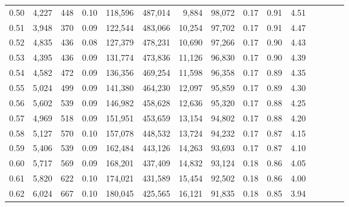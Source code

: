 \begin{tabular}{rrrcrrrrrrrrrrr}
0.50 &   4,227 &    448 &                                       0.10 &  118,596 &  487,014 &    9,884 &   98,072 &  0.17 &  0.91 &                         4.51 \\
0.51 &   3,948 &    370 &                                       0.09 &  122,544 &  483,066 &   10,254 &   97,702 &  0.17 &  0.91 &                         4.47 \\
0.52 &   4,835 &    436 &                                       0.08 &  127,379 &  478,231 &   10,690 &   97,266 &  0.17 &  0.90 &                         4.43 \\
0.53 &   4,395 &    436 &                                       0.09 &  131,774 &  473,836 &   11,126 &   96,830 &  0.17 &  0.90 &                         4.39 \\
0.54 &   4,582 &    472 &                                       0.09 &  136,356 &  469,254 &   11,598 &   96,358 &  0.17 &  0.89 &                         4.35 \\
0.55 &   5,024 &    499 &                                       0.09 &  141,380 &  464,230 &   12,097 &   95,859 &  0.17 &  0.89 &                         4.30 \\
0.56 &   5,602 &    539 &                                       0.09 &  146,982 &  458,628 &   12,636 &   95,320 &  0.17 &  0.88 &                         4.25 \\
0.57 &   4,969 &    518 &                                       0.09 &  151,951 &  453,659 &   13,154 &   94,802 &  0.17 &  0.88 &                         4.20 \\
0.58 &   5,127 &    570 &                                       0.10 &  157,078 &  448,532 &   13,724 &   94,232 &  0.17 &  0.87 &                         4.15 \\
0.59 &   5,406 &    539 &                                       0.09 &  162,484 &  443,126 &   14,263 &   93,693 &  0.17 &  0.87 &                         4.10 \\
0.60 &   5,717 &    569 &                                       0.09 &  168,201 &  437,409 &   14,832 &   93,124 &  0.18 &  0.86 &                         4.05 \\
0.61 &   5,820 &    622 &                                       0.10 &  174,021 &  431,589 &   15,454 &   92,502 &  0.18 &  0.86 &                         4.00 \\
0.62 &   6,024 &    667 &                                       0.10 &  180,045 &  425,565 &   16,121 &   91,835 &  0.18 &  0.85 &                         3.94 \\

\end{tabular}
